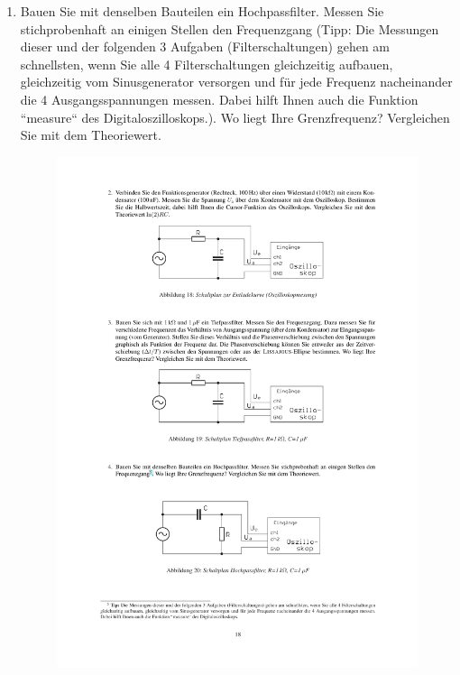 \documentclass[12pt]{scrartcl}
\begin{document}
\begin{enumerate}
\begin{figure}[htbp]
  \label{fig:Tiefpass_2}
\end{figure}
\newpage
{}
\item
Bauen Sie mit denselben Bauteilen ein Hochpassfilter. Messen Sie stichprobenhaft an einigen Stellen den Frequenzgang (Tipp: Die Messungen dieser und der folgenden 3 Aufgaben (Filterschaltungen) gehen am schnellsten, wenn Sie alle 4 Filterschaltungen
gleichzeitig aufbauen, gleichzeitig vom Sinusgenerator versorgen und für jede Frequenz nacheinander die 4 Ausgangsspannungen messen.
Dabei hilft Ihnen auch die Funktion “measure“ des Digitaloszilloskops.). Wo liegt Ihre Grenzfrequenz? Vergleichen Sie mit dem Theoriewert.
\begin{figure}[htbp] 
  \centering
    \includegraphics[trim = 20mm 60mm 1mm 190mm, clip, scale = 1]{tiefpass.pdf}

\end{figure}
\end{enumerate}
\end{document}
